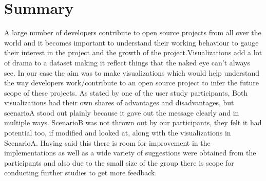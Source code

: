 \documentclass[seploa]{beavtex}
\begin{document}
\chapter{Summary}
A large number of developers contribute to open source projects from all over the world and it becomes important to understand their working behaviour to gauge their interest in the project and the growth of the project.Visualizations add a lot of drama to a dataset making it reflect things that the naked eye can't always see. In our case the aim was to make visualizations which would help understand the way developers work/contribute to an open source project to infer the future scope of these projects. As stated by one of the user study participants,  Both visualizations had their own shares of advantages and disadvantages, but scenarioA stood out plainly because it gave out the message clearly and in multiple ways. ScenarioB was not thrown out by our participants, they felt it had potential too, if modified and looked at, along with the visualizations in ScenarioA. Having said this there is room for improvement in the implementations as well as a wide variety of suggestions were obtained from the participants and also due to the small size of the group there is scope for conducting further studies to get more feedback. 



\end{document}
